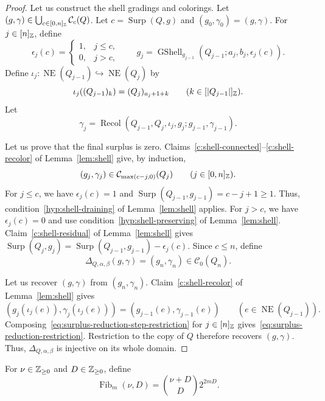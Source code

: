 \begin{proof}
Let us construct the shell gradings and colorings.
Let $(g,\gamma)\in\bigcup_{c\in[0,n]_{\mathbb Z}}\mathcal C_c(Q)$.
Let $c=\operatorname{Surp}(Q,g)$ and $(g_0,\gamma_0)=(g,\gamma)$.
For $j\in[n]_{\mathbb Z}$, define
\[
 \epsilon_j(c)=\begin{cases}1,&j\le c,\\0,&j>c,\end{cases}
 \qquad
 g_j=\operatorname{GShell}_{g_{j-1}}(Q_{j-1};a_j,b_j,\epsilon_j(c)).
\]
Define $\iota_j\colon\operatorname{NE}(Q_{j-1})\hookrightarrow\operatorname{NE}(Q_j)$ by
\[
 \iota_j((Q_{j-1})_k)=(Q_j)_{a_j+1+k}
 \qquad(k\in[|Q_{j-1}|]_{\mathbb Z}).
\]
Let
\[
 \gamma_j=\operatorname{Recol}
 (Q_{j-1},Q_j,\iota_j,g_j;g_{j-1},\gamma_{j-1}).
\]

Let us prove that the final surplus is zero.
Claims~\ref{c:shell-connected}--\ref{c:shell-recolor} of Lemma~\ref{lem:shell} give, by induction,
\[
 (g_j,\gamma_j)\in\mathcal C_{\max(c-j,0)}(Q_j)
 \qquad(j\in[0,n]_{\mathbb Z}).
\]
For $j\le c$, we have $\epsilon_j(c)=1$ and
$\operatorname{Surp}(Q_{j-1},g_{j-1})=c-j+1\ge1$.
Thus, condition~\ref{hyp:shell-draining} of Lemma~\ref{lem:shell} applies.
For $j>c$, we have $\epsilon_j(c)=0$ and use condition~\ref{hyp:shell-preserving} of Lemma~\ref{lem:shell}.
Claim~\ref{c:shell-residual} of Lemma~\ref{lem:shell} gives
$\operatorname{Surp}(Q_j,g_j)=\operatorname{Surp}(Q_{j-1},g_{j-1})-\epsilon_j(c)$.
Since $c\le n$, define
\[
 \Delta_{Q,\alpha,\beta}(g,\gamma)=(g_n,\gamma_n)
 \in\mathcal C_0(Q_n).
\]

Let us recover $(g,\gamma)$ from $(g_n,\gamma_n)$.
Claim~\ref{c:shell-recolor} of Lemma~\ref{lem:shell} gives
\begin{equation}\label{eq:surplus-reduction-step-restriction}
 (g_j(\iota_j(e)),\gamma_j(\iota_j(e)))
 =(g_{j-1}(e),\gamma_{j-1}(e))
 \qquad(e\in\operatorname{NE}(Q_{j-1})).
\end{equation}
Composing~\eqref{eq:surplus-reduction-step-restriction} for $j\in[n]_{\mathbb Z}$ gives~\eqref{eq:surplus-reduction-restriction}.
Restriction to the copy of $Q$ therefore recovers $(g,\gamma)$. Thus,
$\Delta_{Q,\alpha,\beta}$ is injective on its whole domain.
\end{proof}

\begin{definition}\label{def:fiber-bound}
For $\nu\in\mathbb Z_{\ge0}$ and $D\in\mathbb Z_{\ge0}$, define
\[
 \operatorname{Fib}_m(\nu,D)=\binom{\nu+D}{D}2^{2mD}.
\]
\end{definition}

